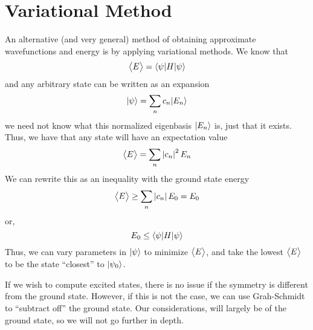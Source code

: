 \section{Variational Method}
An alternative (and very general) method of obtaining approximate wavefunctions and energy is by applying variational methods. We know that 
\[\left\langle \begin{matrix}E\end{matrix} \right\rangle = \langle\psi\rvert H\lvert\psi\rangle\]
and any arbitrary state can be written as an expansion
\[\lvert\psi\rangle = \sum_n c_n\lvert E_n\rangle\]
we need not know what this normalized eigenbasis \(\lvert E_n\rangle\) is, just that it exists. Thus, we have that any state will have an expectation value
\[\left\langle \begin{matrix}E\end{matrix} \right\rangle = \sum_n \left|c_n\right|^2E_n\]
We can rewrite this as an inequality with the ground state energy
\[\left\langle \begin{matrix}E\end{matrix} \right\rangle\geq \sum_n\left|c_n\right|E_0 = E_0\]
or, 
\begin{equation}
	E_0\leq \langle\psi\rvert H \lvert\psi\rangle
\end{equation}
Thus, we can vary parameters in \(\lvert\psi\rangle\) to minimize \(\left\langle \begin{matrix}E\end{matrix} \right\rangle\), and take the lowest \(\left\langle \begin{matrix}E\end{matrix} \right\rangle\) to be the state ``closest'' to \(\lvert\psi_0\rangle\).

If we wish to compute excited states, there is no issue if the symmetry is different from the ground state. However, if this is not the case, we can use Grah-Schmidt to ``subtract off'' the ground state. Our considerations, will largely be of the ground state, so we will not go further in depth.


